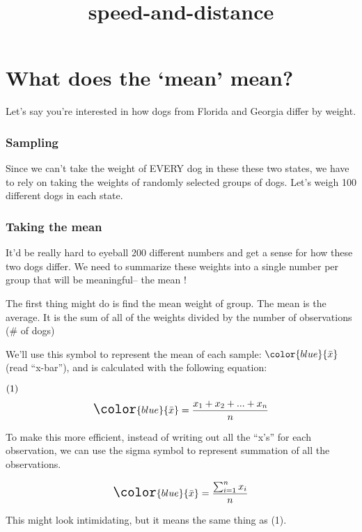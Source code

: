 \documentclass[]{article}
\title{speed-and-distance}
\author{}
\date{}
\begin{document}
\maketitle

\section{\texorpdfstring{What does the `mean'
mean?}{What does the mean mean?}}\label{what-does-the-mean-mean}

Let's say you're interested in how dogs from Florida and Georgia differ
by weight.

\subsubsection{Sampling}\label{sampling}

Since we can't take the weight of EVERY dog in these these two states,
we have to rely on taking the weights of randomly selected groups of
dogs. Let's weigh 100 different dogs in each state.

\subsubsection{Taking the mean}\label{taking-the-mean}

It'd be really hard to eyeball 200 different numbers and get a sense for
how these two dogs differ. We need to summarize these weights into a
single number per group that will be meaningful-- { the mean }!

The first thing might do is find the mean weight of group. The mean is
the average. It is the sum of all of the weights divided by the number
of observations (\# of dogs)

We'll use this symbol to represent the mean of each sample:
\(\color{blue}{\bar{x}}\) (read ``x-bar''), and is calculated with the
following equation:

\(\text(1)\)
\[\Large \color{blue}{\bar{x}} = \frac{x_1 + x_2 + ... + x_n}{n}\]

To make this more efficient, instead of writing out all the ``x's'' for
each observation, we can use the sigma symbol to represent summation of
all the observations.

\begin{equation}
 \Large \color{blue}{\bar{x}} = \frac{\sum_{i=1}^n x_i}{n}
 \label{eq:mean}
 \end{equation}

This might look intimidating, but it means the same thing as (1).
\end{document}
